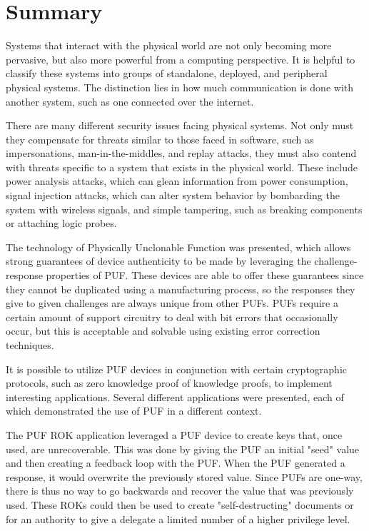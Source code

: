 %
%

\chapter{Summary}
\label{chapter:conclusion}

Systems that interact with the physical world are not only becoming more pervasive, but also more powerful
from a computing perspective. It is helpful to classify these systems into groups of standalone, deployed, and
peripheral physical systems. The distinction lies in how much communication is done with another system,
such as one connected over the internet.

There are many different security issues facing physical systems. Not only must they compensate for threats similar
to those faced in software, such as impersonations, man-in-the-middles, and replay attacks, they must also
contend with threats specific to a system that exists in the physical world. These include power analysis attacks,
which can glean information from power consumption, signal injection attacks, which can alter system behavior by
bombarding the system with wireless signals, and simple tampering, such as breaking components or attaching logic
probes.

The technology of Physically Unclonable Function was presented, which allows strong guarantees of device authenticity
to be made by leveraging the challenge-response properties of PUF. These devices are able to offer these guarantees
since they cannot be duplicated using a manufacturing process, so the responses they give to given challenges are
always unique from other PUFs. PUFs require a certain amount of support circuitry to deal with bit errors that occasionally
occur, but this is acceptable and solvable using existing error correction techniques.

It is possible to utilize PUF devices in conjunction with certain cryptographic protocols, such as zero knowledge proof
of knowledge proofs, to implement interesting applications. Several different applications were presented, each of
which demonstrated the use of PUF in a different context.

The PUF ROK application leveraged a PUF device to create keys that, once used, are unrecoverable. This was done by
giving the PUF an initial "seed" value and then creating a feedback loop with the PUF. When the PUF generated a response,
it would overwrite the previously stored value. Since PUFs are one-way, there is thus no way to go backwards and
recover the value that was previously used. These ROKs could then be used to create "self-destructing" documents
or for an authority to give a delegate a limited number of a higher privilege level.

